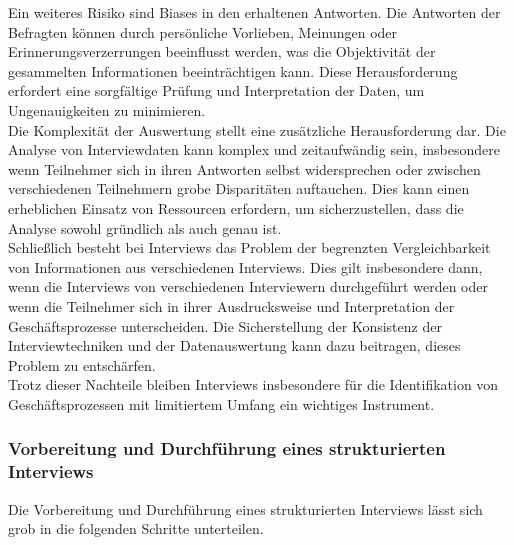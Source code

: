 Ein weiteres Risiko sind Biases in den erhaltenen Antworten. Die Antworten der Befragten können durch persönliche Vorlieben, Meinungen oder Erinnerungsverzerrungen beeinflusst werden, was die Objektivität der gesammelten Informationen beeinträchtigen kann. Diese Herausforderung erfordert eine sorgfältige Prüfung und Interpretation der Daten, um Ungenauigkeiten zu minimieren.\\

Die Komplexität der Auswertung stellt eine zusätzliche Herausforderung dar. Die Analyse von Interviewdaten kann komplex und zeitaufwändig sein, insbesondere wenn Teilnehmer sich in ihren Antworten selbst widersprechen oder zwischen verschiedenen Teilnehmern grobe Disparitäten auftauchen. Dies kann einen erheblichen Einsatz von Ressourcen erfordern, um sicherzustellen, dass die Analyse sowohl gründlich als auch genau ist.\\

Schließlich besteht bei Interviews das Problem der begrenzten Vergleichbarkeit von Informationen aus verschiedenen Interviews. Dies gilt insbesondere dann, wenn die Interviews von verschiedenen Interviewern durchgeführt werden oder wenn die Teilnehmer sich in ihrer Ausdrucksweise und Interpretation der Geschäftsprozesse unterscheiden. Die Sicherstellung der Konsistenz der Interviewtechniken und der Datenauswertung kann dazu beitragen, dieses Problem zu entschärfen.\\

Trotz dieser Nachteile bleiben Interviews insbesondere für die Identifikation von Geschäftsprozessen mit limitiertem Umfang ein wichtiges Instrument.

\subsubsection{Vorbereitung und Durchführung eines strukturierten Interviews}

Die Vorbereitung und Durchführung eines strukturierten Interviews lässt sich grob in die folgenden Schritte unterteilen.~\cite{Seidman2006, Kvale2009}

